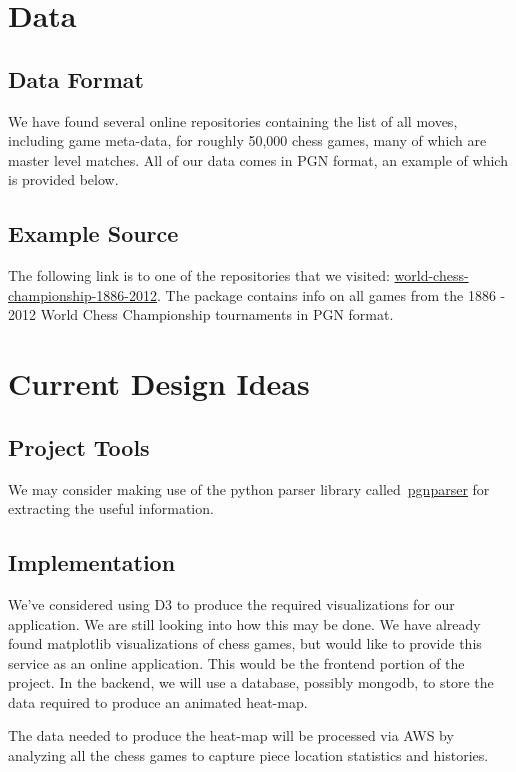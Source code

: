 \documentclass[a4paper,10pt,oneside,leqno,titlepage,onecolumn]{article}
\begin{document}
\section*{Data}
\subsection{Data Format}
We have found several online repositories containing the list of all moves, including game meta-data, for roughly 50,000 chess games, many of which are master level matches. All of our data comes in PGN format, an example of which is provided below.


\subsection{Example Source}
The following link is to one of the repositories that we visited: \href{http://www.chess.com/download/view/world-chess-championship-1886-2012}{world-chess-championship-1886-2012}. The package contains info on all games from the 1886 - 2012 World Chess Championship tournaments in PGN format. 

\section{Current Design Ideas}
\subsection{Project Tools}
We may consider making use of the python parser library called~\href{https://pypi.python.org/pypi/pgnparser/1.0}{pgnparser} for extracting the useful information.

\subsection{Implementation}
We've considered using D3 to produce the required visualizations for our application. We are still looking into how this may be done. We have already found matplotlib visualizations of chess games, but would like to provide this service as an online application. This would be the frontend portion of the project. In the backend, we will use a database, possibly mongodb, to store the data required to produce an animated heat-map. 

The data needed to produce the heat-map will be processed via AWS by analyzing all the chess games to capture piece location statistics and histories.
\end{document}

